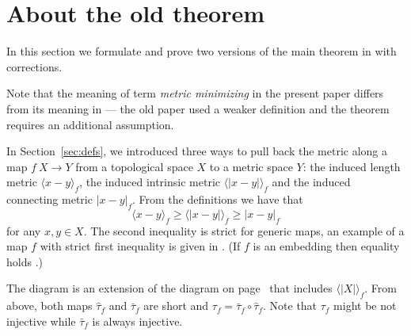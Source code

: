 \section{About the old theorem}\label{sec:old-thm}

In this section we formulate and prove two versions of the main theorem in \cite{petrunin-metric-min} with corrections.

Note that the meaning of term \emph{metric minimizing} in the present paper differs from its meaning in \cite{petrunin-metric-min} --- the old paper used a weaker definition and the theorem requires an additional assumption.

In Section~\ref{sec:defs}, we introduced three ways to pull back the metric along a map $f\:X\to Y$ from a topological space $X$ to a metric space $Y$: 
the induced length metric
$\langle x-y\rangle_f$,
the induced intrinsic metric $\langle| x-y|\rangle_f$
and the induced connecting metric $|x-y|_f$.
From the definitions we have that 
\[\langle x-y\rangle_f\ge \langle| x-y|\rangle_f\ge |x-y|_f\]
for any $x,y\in X$.
The second inequality is strict for generic maps, 
an example of a map $f$ with strict first inequality is given in \cite[4.2]{petrunin-intrinisic}.
(If $f$ is an embedding then equality holds \cite[4.5]{ledonne}.)
\begin{figure}[h]
\centering
{}
\end{figure}
The diagram is an extension of the diagram on page~\pageref{diagram-page} that includes $\langle|X|\rangle_f$.
From above, both maps $\hat\tau_f$ and $\bar\tau_f$ are short and $\tau_f=\bar\tau_f\circ\hat\tau_f$.
Note that $\tau_f$ might be not injective while $\bar\tau_f$ is always injective.

